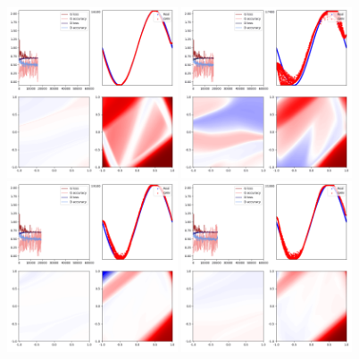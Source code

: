 \documentclass[lang=cn,11pt]{elegantpaper}
\begin{document}
\begin{figure}[hbt]
  \includegraphics[width=0.45\textwidth]{sin_5_1}
  \includegraphics[width=0.45\textwidth]{sin_5_2}\\
  \includegraphics[width=0.45\textwidth]{sin_5_3}
  \includegraphics[width=0.45\textwidth]{sin_5_4}
  \caption{}
\end{figure}
\end{document}
